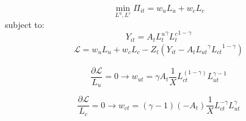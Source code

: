\documentclass[11pt, a4paper]{article}
\begin{document}
\begin{equation}
  \min_{L^u, L^c} \Pi_{it} = w_u L_u+ w_c L_c
\end{equation}
subject to:
\begin{equation}
  Y_{it} = A_t {L_t^u}^ \gamma {L^c_t}^{1-\gamma}
\end{equation}
\begin{equation}
\begin{aligned}
  \mathcal{L} = w_uL_u + w_cL_c  - Z_t\left(Y_{it} - A_t {L_{ut}}^ \gamma {L_{ct}}^{1-\gamma}\right)
  \end{aligned}
\end{equation}

\begin{equation}
  \frac{\partial \mathcal{L}}{L_u} = 0  \rightarrow w_{ut} = \gamma A_t \frac{1}{X} L_{ct}^{(1-\gamma)}L_{ut}^{\gamma-1}
\end{equation}

\begin{equation}
  \frac{\partial \mathcal{L}}{L_c} = 0  \rightarrow w_{ct} = (\gamma -1) (-A_t)\frac{1}{X}L_{ct}^{-\gamma}L_{ut}^\gamma
\end{equation}
\end{document}
